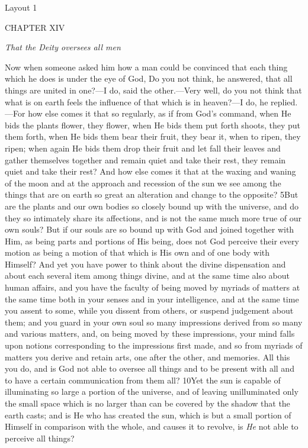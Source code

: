
Layout 1

CHAPTER XIV

\emph{That the Deity oversees all men}

Now when someone asked him how a man could be convinced that each thing which he does is under the eye of God, Do you not think, he answered, that all things are united in one?—I do, said the other.—Very well, do you not think that what is on earth feels the influence of that which is in heaven?—I do, he replied.—For how else comes it that so regularly, as if from God's command, when He bids the plants flower, they flower, when He bids them put forth shoots, they put them forth, when He bids them bear their fruit, they bear it, when to ripen, they ripen; when again He bids them drop their fruit and let fall their leaves and gather themselves together and remain quiet and take their rest, they remain quiet and take their rest? And how else comes it that at the waxing and waning of the moon and at the approach and recession of the sun we see among the things that are on earth so great an alteration and change to the opposite? 5But are the plants and our own bodies so closely bound up with the universe, and do they so intimately share its affections, and is not the same much more true of our own souls? But if our souls are so bound up with God and joined together with Him, as being parts and portions of His being, does not God perceive their every motion as being a motion of that which is His own and of one body with Himself? And yet you have power to think about the divine dispensation and about each several item among things divine, and at the same time also about human affairs, and you have the faculty of being moved by myriads of matters at the same time both in your senses and in your intelligence, and at the same time you assent to some, while you dissent from others, or suspend judgement about them; and you guard in your own soul so many impressions derived from so many and various matters, and, on being moved by these impressions, your mind falls upon notions corresponding to the impressions first made, and so from myriads of matters you derive and retain arts, one after the other, and memories. All this you do, and is God not able to oversee all things and to be present with all and to have a certain communication from them all? 10Yet the sun is capable of illuminating so large a portion of the universe, and of leaving unilluminated only the small space which is no larger than can be covered by the shadow that the earth casts; and is He who has created the sun, which is but a small portion of Himself in comparison with the whole, and causes it to revolve, is \emph{He} not able to perceive all things?

